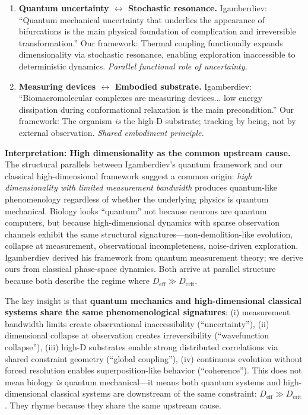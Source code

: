 \documentclass[12pt]{article}
\begin{document}
\begin{enumerate}
\item \textbf{Quantum uncertainty $\leftrightarrow$ Stochastic resonance.} Igamberdiev: ``Quantum mechanical uncertainty that underlies the appearance of bifurcations is the main physical foundation of complication and irreversible transformation.'' Our framework: Thermal coupling functionally expands dimensionality via stochastic resonance, enabling exploration inaccessible to deterministic dynamics. \textit{Parallel functional role of uncertainty.}

\item \textbf{Measuring devices $\leftrightarrow$ Embodied substrate.} Igamberdiev: ``Biomacromolecular complexes are measuring devices... low energy dissipation during conformational relaxation is the main precondition.'' Our framework: The organism \textit{is} the high-D substrate; tracking by being, not by external observation. \textit{Shared embodiment principle.}
\end{enumerate}

\textbf{Interpretation: High dimensionality as the common upstream cause.} The structural parallels between Igamberdiev's quantum framework and our classical high-dimensional framework suggest a common origin: \textit{high dimensionality with limited measurement bandwidth} produces quantum-like phenomenology regardless of whether the underlying physics is quantum mechanical. Biology looks ``quantum'' not because neurons are quantum computers, but because high-dimensional dynamics with sparse observation channels exhibit the same structural signatures---non-demolition-like evolution, collapse at measurement, observational incompleteness, noise-driven exploration. Igamberdiev derived his framework from quantum measurement theory; we derive ours from classical phase-space dynamics. Both arrive at parallel structure because both describe the regime where $D_{\text{eff}} \gg D_{\text{crit}}$.

The key insight is that \textbf{quantum mechanics and high-dimensional classical systems share the same phenomenological signatures}: (i) measurement bandwidth limits create observational inaccessibility (``uncertainty''), (ii) dimensional collapse at observation creates irreversibility (``wavefunction collapse''), (iii) high-D substrates enable strong distributed correlations via shared constraint geometry (``global coupling''), (iv) continuous evolution without forced resolution enables superposition-like behavior (``coherence''). This does not mean biology \textit{is} quantum mechanical---it means both quantum systems and high-dimensional classical systems are downstream of the same constraint: $D_{\text{eff}} \gg D_{\text{crit}}$. They rhyme because they share the same upstream cause.
\end{document}
